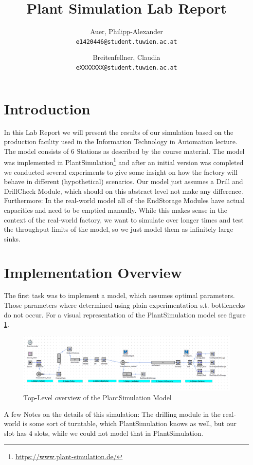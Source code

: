 \documentclass{report}
\begin{document}
\title{Plant Simulation Lab Report}
\author{
	Auer, Philipp-Alexander\\
	\texttt{e1420446@student.tuwien.ac.at}
	\and
	Breitenfellner, Claudia\\
	\texttt{eXXXXXXX@student.tuwien.ac.at}
}

\maketitle
\tableofcontents
\pagebreak
\section{Introduction}
In this Lab Report we will present the results of our simulation based on the production facility used in the Information Technology in Automation lecture. The model consists of 6 Stations as described by the course material. The model was implemented in PlantSimulation\footnote{\url{https://www.plant-simulation.de/}} and after an initial version was completed we conducted several experiments to give some insight on how the factory will behave in different (hypothetical) scenarios.
Our model just assumes a Drill and DrillCheck Module, which should on this abstract level not make any difference. 
Furthermore: In the real-world model all of the EndStorage Modules have actual capacities and need to be emptied manually. While this makes sense in the context of the real-world factory, we want to simulate over longer times and test the throughput limits of the model, so we just model them as infinitely large sinks.
\section{Implementation Overview}
The first task was to implement a model, which assumes optimal parameters. Those parameters where determined using plain experimentation s.t. bottlenecks do not occur. For a visual representation of the PlantSimulation model see figure \ref{fig:overview}.
\begin{figure}[h!]
	\includegraphics[width=\textwidth]{figures/overview.png}
	\caption{Top-Level overview of the PlantSimulation Model}
	\label{fig:overview}
\end{figure}
A few Notes on the details of this simulation: The drilling module in the real-world is some sort of turntable, which PlantSimulation knows as well, but our slot has 4 slots, while we could not model that in PlantSimulation. 
\end{document}
